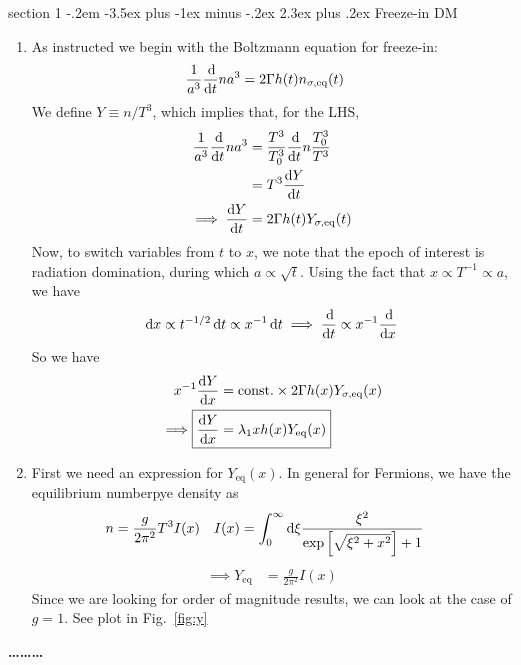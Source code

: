 \documentclass[12pt]{article}
\makeatletter
\newenvironment{problem}{\@startsection
	{section}
	{1}
	{-.2em}
	{-3.5ex plus -1ex minus -.2ex}
	{2.3ex plus .2ex}
	{\pagebreak[3]%
		\large\bf\noindent{Problem }
	}
}
{%
	\begin{center}\large\bf \ldots\ldots\ldots\end{center}}
\makeatother
\begin{document}
	\begin{problem}{Freeze-in DM}
		\begin{enumerate}[label=(\alph*)]
			\item As instructed we begin with the Boltzmann equation for freeze-in: \begin{align*}
				\frac{1}{a^3} \frac{\dif}{\dif t} na^3 &= 2\Gamma h(t)n_\mathrm{\sigma,eq}(t)
			\end{align*} We define $Y\equiv n/T^3$, which implies that, for the LHS, \begin{align*}
				\frac{1}{a^3} \frac{\dif}{\dif t} na^3 &= \frac{T^3}{T_0^3} \frac{\dif}{\dif t} n\frac{T_0^3}{T^3}
				\\
				&= T^3 \frac{\dif Y}{\dif t}
				\\
				\implies \frac{\dif Y}{\dif t} &= 2\Gamma h(t)Y_\mathrm{\sigma,eq}(t)
			\end{align*} Now, to switch variables from $t$ to $x$, we note that the epoch of interest is radiation domination, during which $a\propto\sqrt{t}$.  Using the fact that $x\propto T^{-1} \propto a$, we have \begin{align*}
				\dif x \propto t^{-1/2}\dif t \propto x^{-1}\dif t \implies \frac{\dif}{\dif t} \propto x^{-1} \frac{\dif}{\dif x}
			\end{align*} So we have \begin{align*}
				x^{-1}\frac{\dif Y}{\dif x} &= \text{const.} \times 2\Gamma h(x)Y_\mathrm{\sigma,eq}(x)
				\\
				\implies \Aboxed{\frac{\dif Y}{\dif x}  &= \lambda_1 xh(x)Y_\mathrm{eq}(x)}
			\end{align*}
			
			\item First we need an expression for $Y_\mathrm{eq}(x)$.  In general for Fermions, we have the equilibrium numberpye density as \begin{align*}
				n &= \frac{g}{2\pi^2}T^3 I(x) & I(x) &= \int_0^\infty\dif\xi \frac{\xi^2}{\exp\left[\sqrt{\xi^2 + x^2}\right] +1}
			\end{align*}\begin{align*}
				\implies Y_\mathrm{eq} &= \frac{g}{2\pi^2} I(x)
			\end{align*}  Since we are looking for order of magnitude results, we can look at the case of $g=1$.  See plot in Fig.~\ref{fig:y}
			

\end{enumerate}
\end{problem}
\end{document}
